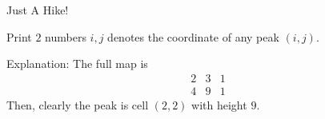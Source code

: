 \begin{problem}{Just A Hike!}
\OutputFile

Print $2$ numbers $i, j$ denotes the coordinate of any peak $(i, j)$.

\Examples

\begin{example}
%
\end{example}

Explanation: The full map is
    \begin{equation}
    \begin{matrix}
        2 & 3 & 1\\
        4 & 9 & 1
    \end{matrix}
    \end{equation}
Then, clearly the peak is cell $(2, 2)$ with height $9$.

\end{problem}
